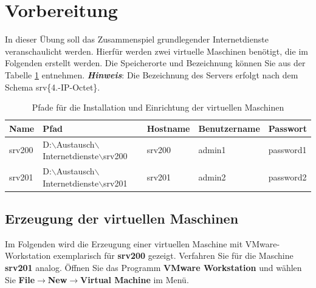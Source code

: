 \section{Vorbereitung}
In dieser Übung soll das Zusammenspiel grundlegender Internetdienste veranschaulicht werden.
Hierfür werden zwei virtuelle Maschinen benötigt, die im Folgenden erstellt
werden. Die Speicherorte und Bezeichnung können Sie aus der Tabelle
\ref{tab:install-location} entnehmen.
\newline
\newline
\textbf{\textit{Hinweis}}: Die Bezeichnung des Servers erfolgt nach dem
Schema srv\{4.-IP-Octet\}.

\scriptsize
\begin{table}[!h]
  \centering
	\begin{tabular}{l l l l l}
		\hline
		Name & Pfad & Hostname & Benutzername & Passwort \\
		\hline
		srv200 & D:$\backslash$Austausch$\backslash$Internetdienste$\backslash$srv200 &
		srv200 & admin1 & password1 \\
		srv201 & D:$\backslash$Austausch$\backslash$Internetdienste$\backslash$srv201 &
		srv201 & admin2 & password2 \\
		\hline
	\end{tabular}
	\caption{Pfade für die Installation und Einrichtung der virtuellen Maschinen}
	\label{tab:install-location}
\end{table}
\normalsize 

\subsection{Erzeugung der virtuellen Maschinen}
Im Folgenden wird die Erzeugung einer virtuellen Maschine mit VMware-Workstation
exemplarisch für \textbf{srv200} gezeigt. Verfahren Sie für die
Maschine \textbf{srv201} analog. Öffnen Sie das Programm  \textbf{VMware
Workstation} und wählen Sie \textbf{File$\rightarrow$New$\rightarrow$Virtual Machine} im Menü.

